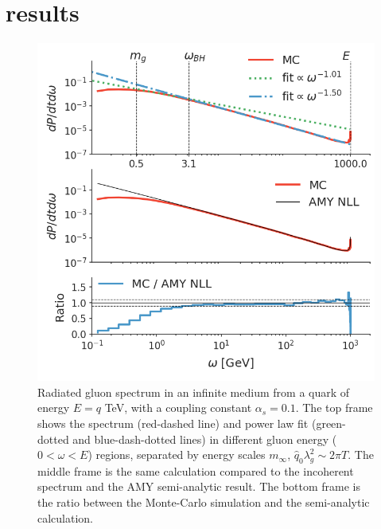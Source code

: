 \documentclass[aps, prc, reprint, amsmath, groupedaddress, nofootinbib]{revtex4-1}
\begin{document}
\section{results}\label{section:results}
\begin{figure}
\includegraphics[width=\columnwidth]{spectrum.png}
\caption{Radiated gluon spectrum in an infinite medium from a quark of energy $E=q$ TeV, with a coupling constant $\alpha_s = 0.1$. The top frame shows the spectrum (red-dashed line) and power law fit (green-dotted and blue-dash-dotted lines) in different gluon energy ($0<\omega < E$) regions, separated by energy scales $m_\infty$, $\hat{q}_0\lambda_g^2 \sim 2\pi T$. The middle frame is the same calculation compared to the incoherent spectrum and the AMY semi-analytic result. The bottom frame is the ratio between the Monte-Carlo simulation and the semi-analytic calculation.}
\label{fig:spectrum}
\end{figure}
\end{document}
